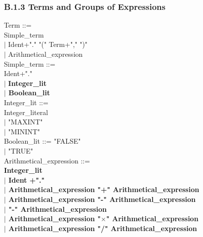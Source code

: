 \documentclass[12pt,a4paper,draft]{article}
\begin{document}
{\begin{sloppypar}
\subsubsection{B.1.3 Terms and Groups of Expressions}
\noindent Term  ::= \\
   Simple\_term\\
\hspace*{0.20in} $|$ Ident+"." "(" Term+"," ")"  \\
\hspace*{0.20in} $|$  Arithmetical\_expression\\
Simple\_term ::= \\
  Ident+"."\\
  \hspace*{0.20in} $|$ \textbf{ Integer\_lit\\
\hspace*{0.20in} $|$  Boolean\_lit}\\
Integer\_lit ::= \\
\hspace*{0.20in} Integer\_literal \\
\hspace*{0.20in} $|$ "MAXINT"\\
\hspace*{0.20in} $|$ "MININT" \\
Boolean\_lit ::= "FALSE"\\
\hspace*{0.20in} $|$ "TRUE" \\
Arithmetical\_expression ::= \\
\hspace*{0.20in}  \textbf{ Integer\_lit\\
\hspace*{0.20in} $|$  Ident +"."\\
\hspace*{0.20in} $|$  Arithmetical\_expression  "+"  Arithmetical\_expression\\
\hspace*{0.20in} $|$  Arithmetical\_expression  "-"  Arithmetical\_expression\\
\hspace*{0.20in} $|$ "-" Arithmetical\_expression \\
\hspace*{0.20in} $|$  Arithmetical\_expression  "$\times$"  Arithmetical\_expression\\
\hspace*{0.20in} $|$  Arithmetical\_expression  "/"  Arithmetical\_expression\\
}
\end{sloppypar}}
\end{document}
